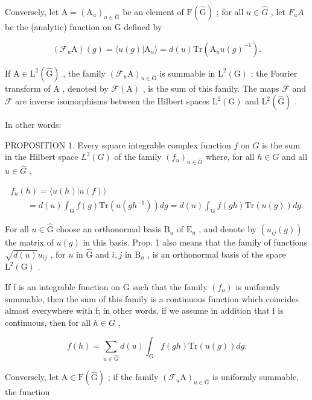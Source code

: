 Conversely, let \(\mathrm{A} = (\mathrm{A}_{u})_{u \in \hat{\mathrm{G}}}\) be an element of \(\mathrm{F}(\hat{\mathrm{G}})\) ; for all \(u \in \hat{G}\) , let \(F_{u}A\) be the (analytic) function on G defined by

\[
(\mathcal {F} _ {u} \mathrm{A}) (g) = \langle u (g) | \mathrm{A} _ {u} \rangle = d (u) \mathrm{Tr} (\mathrm{A} _ {u} u (g) ^ {- 1}).\tag{9}
\]

If \(\mathrm{A} \in \mathrm{L}^2(\hat{\mathrm{G}})\) , the family \((\mathcal{F}_u\mathrm{A})_{u \in \hat{\mathrm{G}}}\) is summable in \(\mathrm{L}^2(\mathrm{G})\) ; the Fourier transform of \(\mathrm{A}\) , denoted by \(\mathcal{F}(\mathrm{A})\) , is the sum of this family. The maps \(\overline{\mathcal{F}}\) and \(\mathcal{F}\) are inverse isomorphisms between the Hilbert spaces \(\mathrm{L}^2(\mathrm{G})\) and \(\mathrm{L}^2(\hat{\mathrm{G}})\) .

In other words:

PROPOSITION 1. Every square integrable complex function \(f\) on \(G\) is the sum in the Hilbert space \(L^2(G)\) of the family \((f_u)_{u\in \hat{G}}\) where, for all \(h\in G\) and all \(u\in \hat{G}\) ,

\[
\begin{array}{l} f _ {u} (h) = \langle u (h) | u (f) \rangle \\ \qquad = d (u) \int_ {\mathrm{G}} f (g) \mathrm{Tr} (u (g h ^ {- 1}))   d g = d (u) \int_ {\mathrm{G}} f (g h) \mathrm{Tr} (u (g))   d g. \end{array}\tag{10}
\]

For all \(u \in \hat{\mathrm{G}}\) choose an orthonormal basis \(\mathrm{B}_u\) of \(\mathrm{E}_u\) , and denote by \((u_{ij}(g))\) the matrix of \(u(g)\) in this basis. Prop. 1 also means that the family of functions \(\sqrt{d(u)} u_{ij}\) , for \(u\) in \(\hat{\mathrm{G}}\) and \(i,j\) in \(\mathrm{B}_u\) , is an orthonormal basis of the space \(\mathrm{L}^2 (\mathrm{G})\) .

If f is an integrable function on G such that the family \((f_{u})\) is uniformly summable, then the sum of this family is a continuous function which coincides almost everywhere with f; in other words, if we assume in addition that f is continuous, then for all \(h \in G\) ,

\[
f (h) = \sum_ {u \in \hat {\mathrm{G}}} d (u) \int_ {\mathrm{G}} f (g h) \mathrm{Tr} (u (g))   d g.\tag{11}
\]

Conversely, let \(\mathrm{A} \in \mathrm{F}(\hat{\mathrm{G}})\) ; if the family \((\mathcal{F}_u\mathrm{A})_{u \in \hat{\mathrm{G}}}\) is uniformly summable, the function

